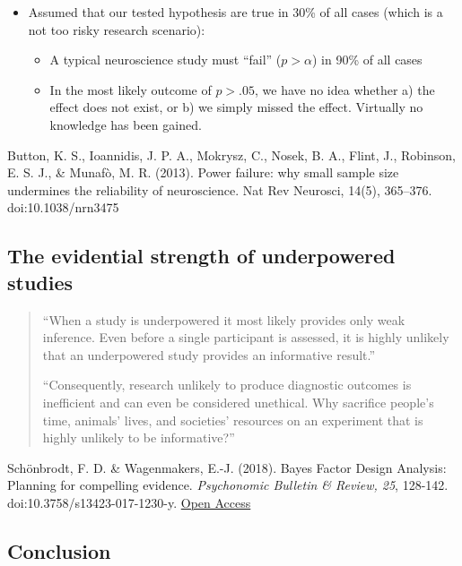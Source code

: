 \documentclass[
  letterpaper,
  DIV=11,
  numbers=noendperiod]{scrartcl}
\providecommand{\tightlist}{%
  \setlength{\itemsep}{0pt}\setlength{\parskip}{0pt}}
\begin{document}
\begin{itemize}
\tightlist
\item
  Assumed that our tested hypothesis are true in 30\% of all cases
  (which is a not too risky research scenario):

  \begin{itemize}
  \tightlist
  \item
    A typical neuroscience study must ``fail'' (\(p > \alpha\)) in 90\%
    of all cases
  \item
    In the most likely outcome of \(p > .05\), we have no idea whether
    a) the effect does not exist, or b) we simply missed the effect.
    Virtually no knowledge has been gained.
  \end{itemize}
\end{itemize}

Button, K. S., Ioannidis, J. P. A., Mokrysz, C., Nosek, B. A., Flint,
J., Robinson, E. S. J., \& Munafò, M. R. (2013). Power failure: why
small sample size undermines the reliability of neuroscience. Nat Rev
Neurosci, 14(5), 365--376. doi:10.1038/nrn3475

\subsection{The evidential strength of underpowered
studies}\label{the-evidential-strength-of-underpowered-studies}

\begin{quote}
``When a study is underpowered it most likely provides only weak
inference. Even before a single participant is assessed, it is highly
unlikely that an underpowered study provides an informative result.''

``Consequently, research unlikely to produce diagnostic outcomes is
inefficient and can even be considered unethical. Why sacrifice people's
time, animals' lives, and societies' resources on an experiment that is
highly unlikely to be informative?''
\end{quote}

Schönbrodt, F. D. \& Wagenmakers, E.-J. (2018). Bayes Factor Design
Analysis: Planning for compelling evidence. \emph{Psychonomic Bulletin
\& Review, 25}, 128-142. doi:10.3758/s13423-017-1230-y.
\href{https://osf.io/d4dcu/}{Open Access}

\subsection{Conclusion}\label{conclusion}
\end{document}
